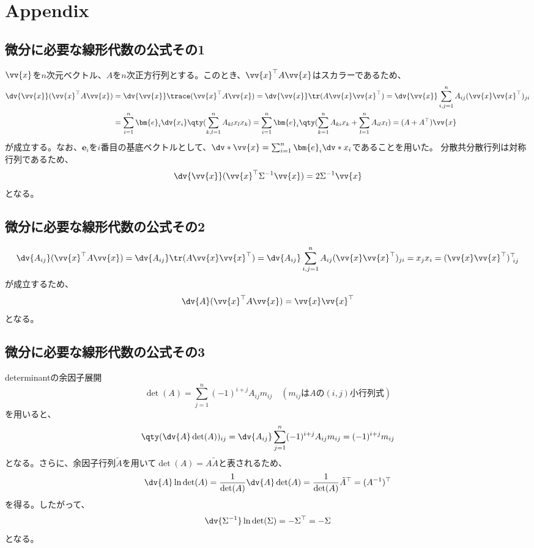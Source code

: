 \documentclass[a4paper,11pt,uplatex]{jsarticle}%
\begin{document}
\section{Appendix}

\subsection{微分に必要な線形代数の公式その1}
$\vv{x}$を$n$次元ベクトル、$A$を$n$次正方行列とする。このとき、$\vv{x}^{\top}A\vv{x}$はスカラーであるため、
\begin{align}
  \dv{\vv{x}}(\vv{x}^{\top}A\vv{x}) & = \dv{\vv{x}}\trace(\vv{x}^{\top}A\vv{x}) = \dv{\vv{x}}\tr(A\vv{x}\vv{x}^{\top})
  = \dv{\vv{x}}\sum_{i,j=1}^{n}A_{ij}(\vv{x}\vv{x}^{\top})_{ji} \notag                                                 \\
                                    & = \sum_{i=1}^{n}\bm{e}_{i}\dv{x_i}\qty(\sum_{k,l=1}^{n}A_{kl}x_lx_k)
  = \sum_{i=1}^{n}\bm{e}_{i}\qty(\sum_{k=1}^{n}A_{ki}x_k + \sum_{l=1}^{n}A_{il}x_l) = (A+A^{\top})\vv{x}
\end{align}
が成立する。なお、$\bm{e}_i$を$i$番目の基底ベクトルとして、$\dv*{\vv{x}} = \sum_{i=1}^{n}\bm{e}_i\dv*{x_i}$であることを用いた。
分散共分散行列は対称行列であるため、
\begin{equation}
  \dv{\vv{x}}(\vv{x}^{\top}\Sigma^{-1}\vv{x}) = 2\Sigma^{-1}\vv{x}
\end{equation}
となる。
\subsection{微分に必要な線形代数の公式その2}
\begin{equation}
  \dv{A_{ij}}(\vv{x}^{\top}A\vv{x})  = \dv{A_{ij}}\tr(A\vv{x}\vv{x}^{\top})
  = \dv{A_{ij}}\sum_{i,j=1}^{n}A_{ij}(\vv{x}\vv{x}^{\top})_{ji} = x_jx_i = (\vv{x}\vv{x}^{\top})^{\top}_{~ij}
\end{equation}
が成立するため、
\begin{equation}
  \dv{A}(\vv{x}^{\top}A\vv{x})  = \vv{x}\vv{x}^{\top}
\end{equation}
となる。
\subsection{微分に必要な線形代数の公式その3}
determinantの余因子展開
\begin{equation}
  \det(A) = \sum_{j=1}^{n}(-1)^{i+j}A_{ij}m_{ij}\quad(m_{ij}\text{は$A\text{の}(i,j)$小行列式})
\end{equation}
を用いると、
\begin{equation}
  \qty(\dv{A}\det(A))_{ij} = \dv{A_{ij}}\sum_{j=1}^{n}(-1)^{i+j}A_{ij}m_{ij}=(-1)^{i+j}m_{ij}
\end{equation}
となる。さらに、余因子行列$\tilde{A}$を用いて$\det(A) = A\tilde{A}$と表されるため、
\begin{equation}
  \dv{A}\ln{\det(A)} = \frac{1}{\det(A)}\dv{A}\det(A) = \frac{1}{\det(A)}\tilde{A}^{\top} = (A^{-1})^{\top}
\end{equation}
を得る。したがって、
\begin{equation}
  \dv{\Sigma^{-1}}\ln{\det(\Sigma)} = -\Sigma^{\top} = -\Sigma
\end{equation}
となる。
\end{document}

